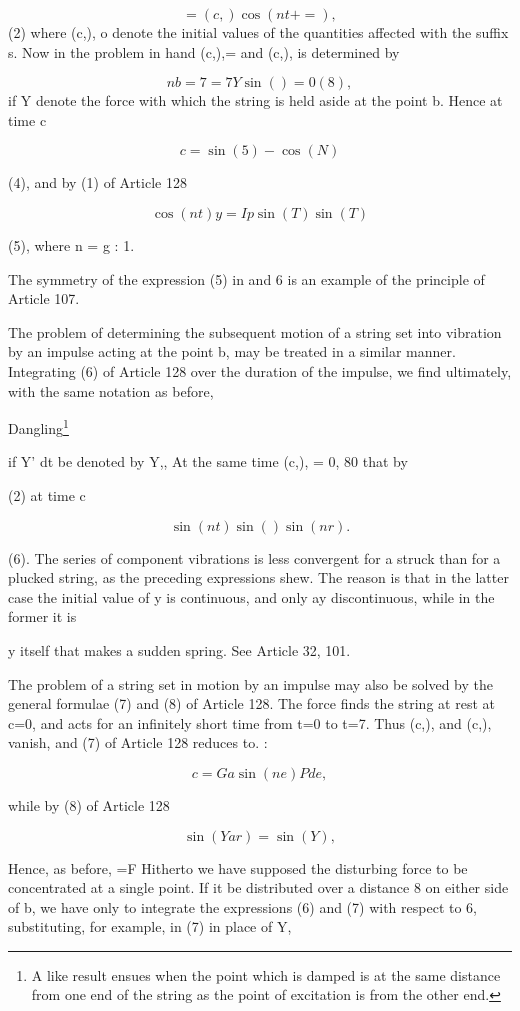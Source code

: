\[= (c,) \cos(nt +=   ),\]
(2) where (c,), o denote the initial values of the
quantities affected with the suffix s. Now in the problem in hand (c,),= and
(c,), is determined by

\[n b= 7 =7 Y \sin()= 0 (8),\]
if Y denote the force with which the string is
held aside at the point b. Hence at time c

\[c =  \sin(5) - \cos(N)\]

(4), and by (1) of Article 128

\[\cos(nt) y= Ip  \sin(T) \sin(T)\]

(5), where n = g : 1.

The symmetry of the expression (5) in and 6 is an example of the principle of
Article 107.

The problem of determining the subsequent motion of a string set into vibration
by an impulse acting at the point b, may be treated in a similar manner.
Integrating (6) of Article 128 over the duration of the impulse, we find
ultimately, with the same notation as before,

Dangling\footnote{A like result ensues when the point which is damped is at the
same distance from one end of the string as the point of excitation is from the
other end.}

if Y' dt be denoted by Y,, At the same time (c,), = 0, 80 that by

(2) at time c

\[\sin(nt) \sin() \sin(nr).\]

(6). The series of component vibrations is less convergent for a struck than
for a plucked string, as the preceding expressions shew. The reason is that in
the latter case the initial value of y is continuous, and only ay
discontinuous, while in the former it is

y itself that makes a sudden spring. See Article 32, 101.

The problem of a string set in motion by an impulse may also be solved by the
general formulae (7) and (8) of Article 128. The force finds the string at rest
at c=0, and acts for an infinitely short time from t=0 to t=7. Thus (c,), and
(c,), vanish, and (7) of Article 128 reduces to. :

\[c = Ga \sin(ne) P de,\]

while by (8) of Article 128

\[\sin(Yar) = \sin(Y),\]

Hence, as before, =F Hitherto we have supposed the disturbing force to be
concentrated at a single point. If it be distributed over a distance 8 on
either side of b, we have only to integrate the expressions (6) and (7) with
respect to 6, substituting, for example, in (7) in place of Y,

